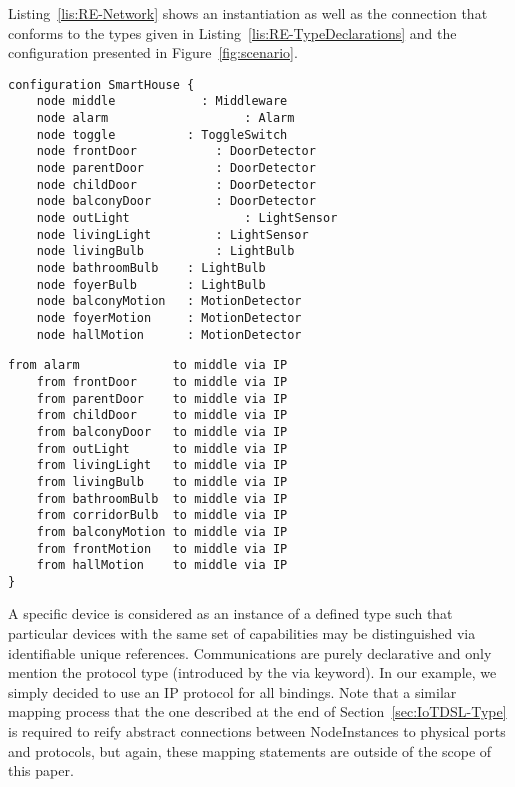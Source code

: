 Listing~\ref{lis:RE-Network} shows an instantiation as well as the connection that conforms to the types given in Listing~\ref{lis:RE-TypeDeclarations} and the configuration presented in Figure~\ref{fig:scenario}.
	
	
\begin{table}
	\begin{minipage}[b]{.45\textwidth }%
		\begin{lstlisting}[language=iotdsl]	
configuration SmartHouse {
	node middle   		   : Middleware
	node alarm					 : Alarm
	node toggle          : ToggleSwitch
	node frontDoor			 : DoorDetector
	node parentDoor			 : DoorDetector
	node childDoor			 : DoorDetector
	node balconyDoor 		 : DoorDetector
	node outLight				 : LightSensor
	node livingLight		 : LightSensor
	node livingBulb			 : LightBulb
	node bathroomBulb    : LightBulb
	node foyerBulb       : LightBulb
	node balconyMotion	 : MotionDetector
	node foyerMotion  	 : MotionDetector
	node hallMotion	     : MotionDetector
		\end{lstlisting}
	\end{minipage}\hfill%
	\begin{minipage}[b]{.45\textwidth}
		\begin{lstlisting}[language=iotdsl, firstnumber=15]
	from alarm			   to middle via IP
	from frontDoor 	   to middle via IP
	from parentDoor    to middle via IP
	from childDoor     to middle via IP
	from balconyDoor   to middle via IP
	from outLight      to middle via IP
	from livingLight   to middle via IP
	from livingBulb    to middle via IP
	from bathroomBulb  to middle via IP
	from corridorBulb  to middle via IP
	from balconyMotion to middle via IP
	from frontMotion   to middle via IP
	from hallMotion    to middle via IP
}
		\end{lstlisting}
		\vspace*{.2cm}
	\end{minipage}
	\label{lis:RE-Network}
\end{table}
	
A specific device is considered as an instance of a defined type such that particular devices with the same set of capabilities may be distinguished via identifiable unique references. Communications are purely declarative and only mention the protocol type (introduced by the \textsf{via} keyword). In our example, we simply decided to use an \textsf{IP} protocol for all bindings. Note that a similar mapping process that the one described at the end of Section~\ref{sec:IoTDSL-Type} is required to reify abstract connections between \textsf{NodeInstances} to physical ports and protocols, but again, these mapping statements are outside of the scope of this paper. 

